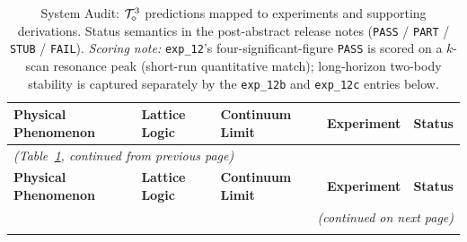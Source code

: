 
{\scriptsize
\setlength{\tabcolsep}{4pt}
\renewcommand{\arraystretch}{0.95}
\begin{longtable}{@{}p{2.6cm}p{3.8cm}p{3.2cm}p{4.4cm}p{1.0cm}@{}}
\caption{\small System Audit: $\mathcal{T}_\diamond^3$ predictions mapped to
experiments and supporting derivations.  Status semantics in the
post-abstract release notes (\texttt{PASS} / \texttt{PART} /
\texttt{STUB} / \texttt{FAIL}).  \emph{Scoring note:}
\texttt{exp\_12}'s four-significant-figure \texttt{PASS} is scored
on a $k$-scan resonance peak (short-run quantitative match);
long-horizon two-body stability is captured separately by the
\texttt{exp\_12b} and \texttt{exp\_12c} entries below.}
\label{tab:audit} \\
\hline
\textbf{Physical Phenomenon} & \textbf{Lattice Logic} & \textbf{Continuum Limit} & \textbf{Experiment} & \textbf{Status} \\
\hline
\endfirsthead

\multicolumn{5}{l}{\textit{(Table~\ref{tab:audit}, continued from previous page)}} \\
\hline
\textbf{Physical Phenomenon} & \textbf{Lattice Logic} & \textbf{Continuum Limit} & \textbf{Experiment} & \textbf{Status} \\
\hline
\endhead

\hline
\multicolumn{5}{r}{\textit{(continued on next page)}} \\
\endfoot


\end{longtable}}
